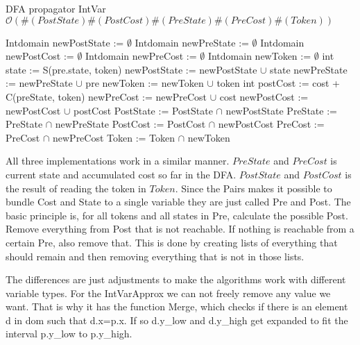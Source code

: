 \documentclass[a4paper,11pt]{article}
\begin{document}
\begin{algorithm}[H]
\caption{DFA propagator IntVar\newline $\mathcal{O}(\#(PostState)\#(PostCost)\#(PreState)\#(PreCost)\#(Token))$}
\begin{algorithmic}[1]
\State Intdomain newPostState := $\emptyset$
\State Intdomain newPreState := $\emptyset$
\State Intdomain newPostCost := $\emptyset$
\State Intdomain newPreCost := $\emptyset$
\State Intdomain newToken := $\emptyset$
		\State int state := S(pre.state, token)
			\State newPostState := newPostState $\cup$ state
			\State newPreState := newPreState $\cup$ pre
			\State newToken := newToken $\cup$ token 
				\State int postCost := cost + C(preState, token)
					\State newPreCost := newPreCost $\cup$ cost
					\State newPostCost := newPostCost $\cup$ postCost
				\EndIf
			\EndFor
		\EndIf
	\EndFor
\EndFor
\State PostState := PostState $\cap$ newPostState
\State PreState := PreState $\cap$ newPreState
\State PostCost := PostCost $\cap$ newPostCost
\State PreCost := PreCost $\cap$ newPreCost
\State Token := Token $\cap$ newToken
\EndProcedure
\end{algorithmic}
\end{algorithm}
All three implementations work in a similar manner. $PreState$ and $PreCost$ is current state and accumulated cost so far in the DFA. $PostState$ and $PostCost$ is the result of reading the token in $Token$. Since the Pairs makes it possible to bundle Cost and State to a single variable they are just called Pre and Post. The basic principle is, for all tokens and all states in Pre, calculate the possible Post. Remove everything from Post that is not reachable. If nothing is reachable from a certain Pre, also remove that. This is done by creating lists of everything that should remain and then removing everything that is not in those lists.

The differences are just adjustments to make the algorithms work with different variable types. For the IntVarApprox we can not freely remove any value we want. That is why it has the function Merge, which checks if there is an element d in dom such that d.x=p.x. If so d.y\_low and d.y\_high get expanded to fit the interval p.y\_low to p.y\_high.
\end{document}

